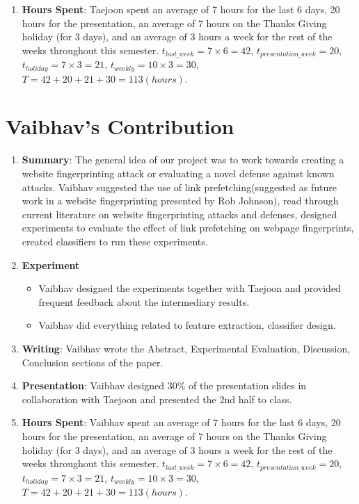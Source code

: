 \documentclass{article}
\begin{document}
\begin{enumerate}
\item
{\bf Hours Spent}: Taejoon spent an average of 7 hours for the last 6 days, 20 hours for the presentation, an average of 7 hours on the Thanks Giving holiday (for 3 days), and an average of 3 hours a week for the rest of the weeks throughout this semester.
$t_{\mathit{last\_week}} = 7 \times 6 = 42$,
$t_{\mathit{presentation\_week}} = 20$,
$t_{\mathit{holiday}} = 7 \times 3 = 21$,
$t_{\mathit{weekly}} = 10 \times 3 = 30$,
$T = 42 + 20 + 21 + 30 = 113 (hours)$.
\end{enumerate}

\section{Vaibhav's Contribution}
\begin{enumerate}
\item
{\bf Summary}:
The general idea of our project was to work towards creating a website fingerprinting attack or evaluating a novel defense against known attacks. 
Vaibhav suggested the use of link prefetching(suggested as future work in a website fingerprinting presented by Rob Johnson), read through current literature on website fingerprinting attacks and defenses, designed experiments to evaluate the effect of link prefetching on webpage fingerprints, created classifiers to run these experiments.
\item
{\bf Experiment}
\begin{itemize}
\item
Vaibhav designed the experiments together with Taejoon and provided frequent feedback about the intermediary results.
\item
Vaibhav did everything related to feature extraction, classifier design.
\end{itemize}
\item
{\bf Writing}: Vaibhav wrote the Abstract, Experimental Evaluation, Discussion, Conclusion sections of the paper.
\item
{\bf Presentation}: Vaibhav designed 30\% of the presentation slides in collaboration with Taejoon and presented the 2nd half to class.
\item
{\bf Hours Spent}: Vaibhav spent an average of 7 hours for the last 6 days, 20 hours for the presentation, an average of 7 hours on the Thanks Giving holiday (for 3 days), and an average of 3 hours a week for the rest of the weeks throughout this semester.
$t_{\mathit{last\_week}} = 7 \times 6 = 42$,
$t_{\mathit{presentation\_week}} = 20$,
$t_{\mathit{holiday}} = 7 \times 3 = 21$,
$t_{\mathit{weekly}} = 10 \times 3 = 30$,
$T = 42 + 20 + 21 + 30 = 113 (hours)$.
\end{enumerate}
\end{document}
